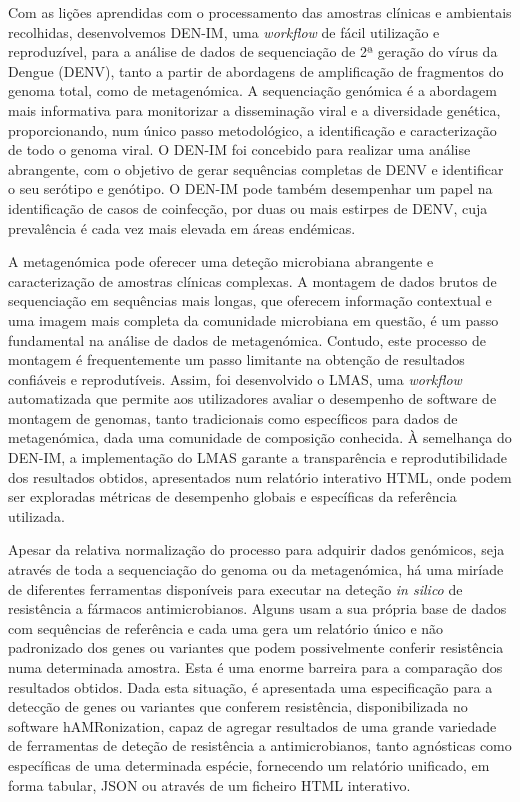 Com as lições aprendidas com o processamento das amostras clínicas e ambientais recolhidas, desenvolvemos DEN-IM, uma \textit{workflow} de fácil utilização e reproduzível, para a análise de dados de sequenciação de 2ª geração do vírus da Dengue (DENV), tanto a partir de abordagens de amplificação de fragmentos do genoma total, como de metagenómica. A sequenciação genómica é a abordagem mais informativa para monitorizar a disseminação viral e a diversidade genética, proporcionando, num único passo metodológico, a identificação e caracterização de todo o genoma viral. O DEN-IM foi concebido para realizar uma análise abrangente, com o objetivo de gerar sequências completas de DENV e identificar o seu serótipo e genótipo. O DEN-IM pode também desempenhar um papel na identificação de casos de coinfecção, por duas ou mais estirpes de DENV, cuja prevalência é cada vez mais elevada em áreas endémicas. 

A metagenómica pode oferecer uma deteção microbiana abrangente e caracterização de amostras clínicas complexas. A montagem de dados brutos de sequenciação em sequências mais longas, que oferecem informação contextual e uma imagem mais completa da comunidade microbiana em questão, é um passo fundamental na análise de dados de metagenómica. Contudo, este processo de montagem é frequentemente um passo limitante na obtenção de resultados confiáveis e reprodutíveis. Assim, foi desenvolvido o LMAS, uma \textit{workflow} automatizada que permite aos utilizadores avaliar o desempenho de software de montagem de genomas, tanto tradicionais como específicos para dados de metagenómica, dada uma comunidade de composição conhecida. À semelhança do DEN-IM, a implementação do LMAS garante a transparência e reprodutibilidade dos resultados obtidos, apresentados num relatório interativo HTML, onde podem ser exploradas métricas de desempenho globais e específicas da referência utilizada. 

Apesar da relativa normalização do processo para adquirir dados genómicos, seja através de toda a sequenciação do genoma ou da metagenómica, há uma miríade de diferentes ferramentas disponíveis para executar na deteção \textit{in silico} de resistência a fármacos antimicrobianos. Alguns usam a sua própria base de dados com sequências de referência e cada uma gera um relatório único e não padronizado dos genes ou variantes que podem possivelmente conferir resistência numa determinada amostra. Esta é uma enorme barreira para a comparação dos resultados obtidos. Dada esta situação, é apresentada uma especificação para a detecção de genes ou variantes que conferem resistência, disponibilizada no software hAMRonization, capaz de agregar resultados de uma grande variedade de ferramentas de deteção de resistência a antimicrobianos, tanto agnósticas como específicas de uma determinada espécie, fornecendo um relatório unificado, em forma tabular, JSON ou através de um ficheiro HTML interativo.

